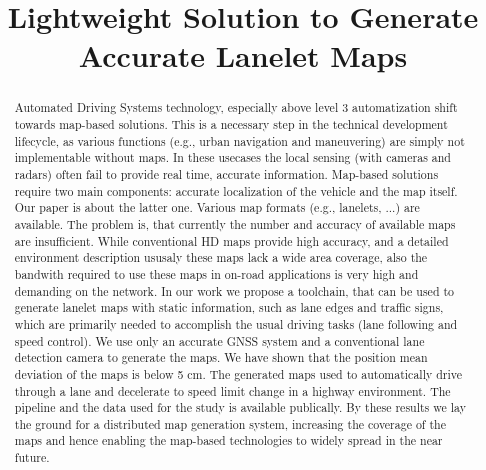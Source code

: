 \documentclass[conference]{IEEEtran}
\begin{document}
\title{Lightweight Solution to Generate Accurate Lanelet Maps\\
}

\author{
\and
{}
\and
{}
}

\maketitle

\begin{abstract}
Automated Driving Systems technology, especially above level 3 automatization shift towards map-based solutions. This is a necessary step in the technical development lifecycle, as various functions (e.g., urban 
navigation and maneuvering) are simply not implementable without maps. In these usecases the local sensing (with cameras and radars) often fail to provide real time, accurate information. Map-based solutions 
require two main components: accurate localization of the vehicle and the map itself. Our paper is about the latter one. Various map formats (e.g., lanelets, ...) are available. The problem is, that currently 
the number and accuracy of available maps are insufficient. While conventional HD maps provide high accuracy, and a detailed environment description ususaly these maps lack a wide area coverage, also the bandwith required to use these maps in on-road applications is very high and demanding on the network. In our work we propose a toolchain, that can be used to generate lanelet maps \cite{poggenhans2018lanelet2} with static information, such as lane edges and traffic signs, which 
are primarily needed to accomplish the usual driving tasks (lane following and speed control). We use only an accurate GNSS system and a conventional lane detection camera to generate the maps. We have shown 
that the position mean deviation of the maps is below 5 cm. The generated maps used to automatically drive through a lane and decelerate to speed limit change in a highway environment. The pipeline and the 
data used for the study is available publically. By these results we lay the ground for a distributed map generation system, increasing the coverage of the maps and hence enabling the map-based technologies 
to widely spread in the near future. 
\end{abstract}
\end{document}
